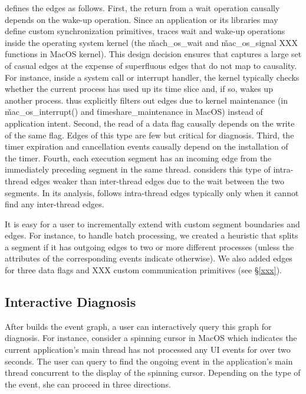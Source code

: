 \xxx defines the edges as follows.  First, the return from a wait
operation causally depends on the wake-up operation.  Since an application
or its libraries may define custom synchronization primitives, \xxx traces
wait and wake-up operations inside the operating system kernel (the
\v{mach\_os\_wait} and \v{mac\_os\_signal} XXX functions in MacOS kernel).
This design decision ensures that \xxx captures a large set of casual
edges at the expense of superfluous edges that do not map to causality.
For instance, inside a system call or interrupt handler, the kernel
typically checks whether the current process has used up its time slice
and, if so, wakes up another process.  \xxx thus explicitly filters out
edges due to kernel maintenance (in \v{mac\_os\_interrupt()} and
\v{timeshare\_maintenance in MacOS}) instead of application intent.
Second, the read of a data flag causally depends on the write of the
same flag.  Edges of this type are few but critical for diagnosis.  Third,
the timer expiration and cancellation events causally depend on the
installation of the timer.  Fourth, each execution segment has an incoming
edge from the immediately preceding segment in the same thread.  \xxx
considers this type of intra-thread edges weaker than inter-thread edges
due to the wait between the two segments.  In its analysis, \xxx follows
intra-thread edges typically only when it cannot find any inter-thread
edges.

It is easy for a user to incrementally extend \xxx with custom segment
boundaries and edges.  For instance, to handle batch processing, we
created a heuristic that splits a segment if it has outgoing edges to two
or more different processes (unless the attributes of the corresponding
events indicate otherwise).  We also added edges for three data flags and
XXX custom communication primitives (see \S\ref{xxx}).

\subsection{Interactive Diagnosis} \label{subsec:debug}

After \xxx builds the event graph, a user can interactively query this
graph for diagnosis.  For instance, consider a spinning cursor in MacOS
which indicates the current application's main thread has not processed
any UI events for over two seconds.  The user can query \xxx to find the
ongoing event in the application's main thread concurrent to the display
of the spinning cursor.  Depending on the type of the event, she can
proceed in three directions.

